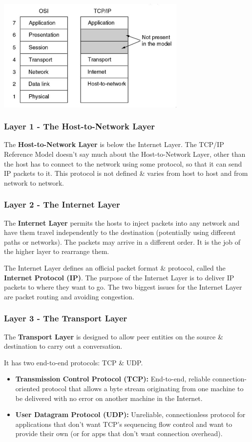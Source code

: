 \documentclass[11pt]{article}
\begin{document}
\begin{center}
    \includegraphics[width=0.7\textwidth]{tcpipmodel.png}
\end{center}

\subsubsection{Layer 1 - The Host-to-Network Layer} 
The \textbf{Host-to-Network Layer} is below the Internet Layer. 
The TCP/IP Reference Model doesn't say much about the Host-to-Network Layer, other than the host has to connect to the network 
using some protocol, so that it can send IP packets to it. 
This protocol is not defined \& varies from host to host and from network to network. 

\subsubsection{Layer 2 - The Internet Layer}
The \textbf{Internet Layer} permits the hosts to inject packets into any network and have them travel independently to the 
destination (potentially using different paths or networks). 
The packets may arrive in a different order. 
It is the job of the higher layer to rearrange them. 

The Internet Layer defines an official packet format \& protocol, called the \textbf{Internet Protocol (IP)}. 
The purpose of the Internet Layer is to deliver IP packets to where they want to go. 
The two biggest issues for the Internet Layer are packet routing and avoiding congestion. 

\subsubsection{Layer 3 - The Transport Layer} 
The \textbf{Transport Layer} is designed to allow peer entities on the source \& destination to carry out a conversation. 

It has two end-to-end protocols: TCP \& UDP. 
\begin{itemize}
    \item   \textbf{Transmission Control Protocol (TCP):} End-to-end, reliable connection-oriented protocol that allows a byte 
            stream originating from one machine to be delivered with no error on another machine in the Internet. 
    \item   \textbf{User Datagram Protocol (UDP):} Unreliable, connectionless protocol for applications that don't want TCP's 
            sequencing flow control and want to provide their own (or for apps that don't want connection overhead). 
\end{itemize}
\end{document}
